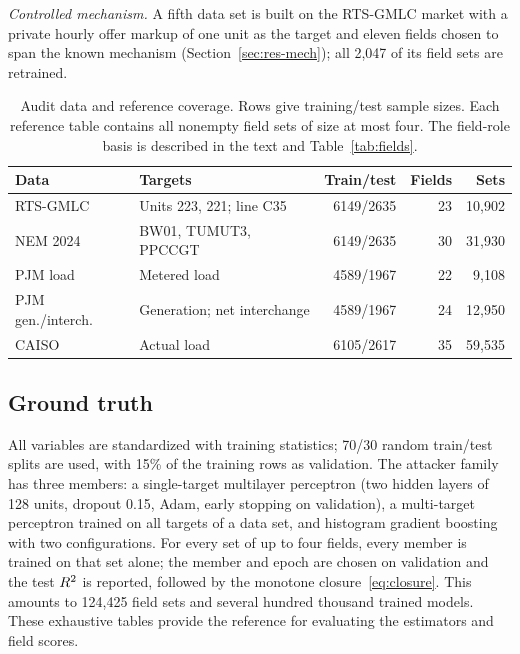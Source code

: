 \emph{Controlled mechanism.} A fifth data set is built on the RTS-GMLC market with a private hourly
offer markup of one unit as the target and eleven fields chosen to span the known mechanism
(Section~\ref{sec:res-mech}); all 2,047 of its field sets are retrained.

\begin{table}[!tb]
\centering\small
\caption{Audit data and reference coverage. Rows give training/test sample sizes. Each reference table contains all nonempty field sets of size at most four. The field-role basis is described in the text and Table~\ref{tab:fields}.}\label{tab:data}
\setlength{\tabcolsep}{5pt}
\begin{tabular}{llrrr}
\toprule
Data & Targets & Train/test & Fields & Sets\\
\midrule
RTS-GMLC & Units 223, 221; line C35 & 6149/2635 & 23 & 10,902\\
NEM 2024 & BW01, TUMUT3, PPCCGT & 6149/2635 & 30 & 31,930\\
PJM load & Metered load & 4589/1967 & 22 & 9,108\\
PJM gen./interch. & Generation; net interchange & 4589/1967 & 24 & 12,950\\
CAISO & Actual load & 6105/2617 & 35 & 59,535\\
\bottomrule
\end{tabular}
\end{table}

\subsection{Ground truth}
All variables are standardized with training statistics; 70/30 random train/test splits are
used, with 15\% of the training rows as validation. The attacker family has three members: a
single-target multilayer perceptron (two hidden layers of 128 units, dropout 0.15, Adam,
early stopping on validation), a multi-target perceptron trained on all targets of a data set,
and histogram gradient boosting with two configurations. For every set of up to four fields,
every member is trained on that set alone; the member and epoch are chosen on validation and the
test $R^2$ is reported, followed by the monotone closure~\eqref{eq:closure}. This amounts to
124,425 field sets and several hundred thousand trained models. These exhaustive tables provide the reference for evaluating the estimators and field scores.

